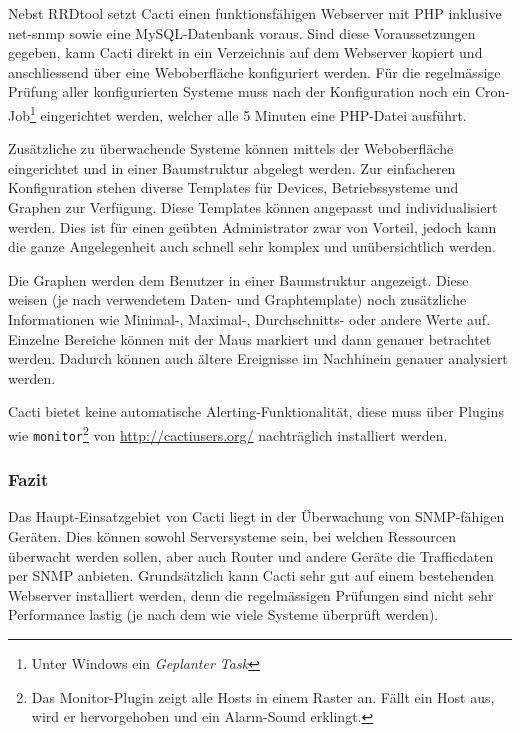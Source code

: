   Nebst RRDtool setzt Cacti einen funktionsf\"ahigen Webserver mit PHP inklusive net-snmp sowie eine MySQL-Datenbank voraus. Sind diese Voraussetzungen gegeben, kann Cacti direkt in ein Verzeichnis auf dem Webserver kopiert und anschliessend \"uber eine Weboberfl\"ache konfiguriert werden. F\"ur die regelm\"assige Pr\"ufung aller konfigurierten Systeme muss nach der Konfiguration noch ein Cron-Job\footnote{Unter Windows ein \textit{Geplanter Task}} eingerichtet werden, welcher alle 5 Minuten eine PHP-Datei ausf\"uhrt.

  Zus\"atzliche zu \"uberwachende Systeme k\"onnen mittels der Weboberfl\"ache eingerichtet und in einer Baumstruktur abgelegt werden. Zur einfacheren Konfiguration stehen diverse Templates f\"ur Devices, Betriebssysteme und Graphen zur Verf\"ugung. Diese Templates k\"onnen angepasst und individualisiert werden. Dies ist f\"ur einen ge\"ubten Administrator zwar von Vorteil, jedoch kann die ganze Angelegenheit auch schnell sehr komplex und un\"ubersichtlich werden.

  Die Graphen werden dem Benutzer in einer Baumstruktur angezeigt. Diese weisen (je nach verwendetem Daten- und Graphtemplate) noch zus\"atzliche Informationen wie Minimal-, Maximal-, Durchschnitts- oder andere Werte auf. Einzelne Bereiche k\"onnen mit der Maus markiert und dann genauer betrachtet werden. Dadurch k\"onnen auch \"altere Ereignisse im Nachhinein genauer analysiert werden.

  Cacti bietet keine automatische Alerting-Funktionalit\"at, diese muss \"uber Plugins wie \texttt{monitor}\footnote{Das Monitor-Plugin zeigt alle Hosts in einem Raster an. F\"allt ein Host aus, wird er hervorgehoben und ein Alarm-Sound erklingt.} von \url{http://cactiusers.org/} nachtr\"aglich installiert werden.

\subsubsection{Fazit} \label{sec:systeme-cacti-fazit}
  Das Haupt-Einsatzgebiet von Cacti liegt in der \"Uberwachung von SNMP-f\"ahigen Ger\"aten. Dies k\"onnen sowohl Serversysteme sein, bei welchen Ressourcen \"uberwacht werden sollen, aber auch Router und andere Ger\"ate die Trafficdaten per SNMP anbieten. Grunds\"atzlich kann Cacti sehr gut auf einem bestehenden Webserver installiert werden, denn die regelm\"assigen Pr\"ufungen sind nicht sehr Performance lastig (je nach dem wie viele Systeme \"uberpr\"uft werden).

